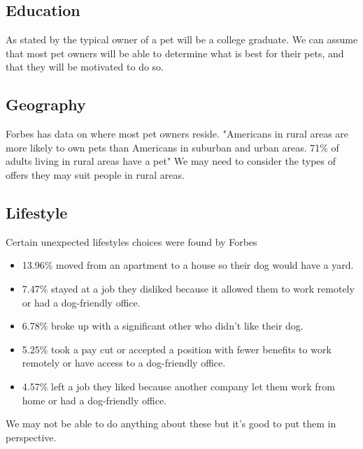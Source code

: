 \documentclass{article}
\begin{document}
\subsection{Education}
As stated by \cite{data} the typical owner of a pet will be a college graduate. We can assume that most pet owners will be able to determine what is best for their pets, and that they will be motivated to do so.

\subsection{Geography}
Forbes has data on where most pet owners reside. "Americans in rural areas are more likely to own pets than Americans in suburban and urban areas. 71\% of adults living in rural areas have a pet" \cite{forbes} We may need to consider the types of offers they may suit people in rural areas.

\subsection{Lifestyle}
Certain unexpected lifestyles choices were found by Forbes \cite{forbes}
\begin{itemize}
    \item 13.96\% moved from an apartment to a house so their dog would have a yard.
    \item 7.47\% stayed at a job they disliked because it allowed them to work remotely or had a dog-friendly office.
    \item 6.78\% broke up with a significant other who didn’t like their dog.
    \item 5.25\% took a pay cut or accepted a position with fewer benefits to work remotely or have access to a dog-friendly office.
    \item 4.57\% left a job they liked because another company let them work from home or had a dog-friendly office.
\end{itemize}
We may not be able to do anything about these but it's good to put them in perspective.

\bigskip

\end{document}
